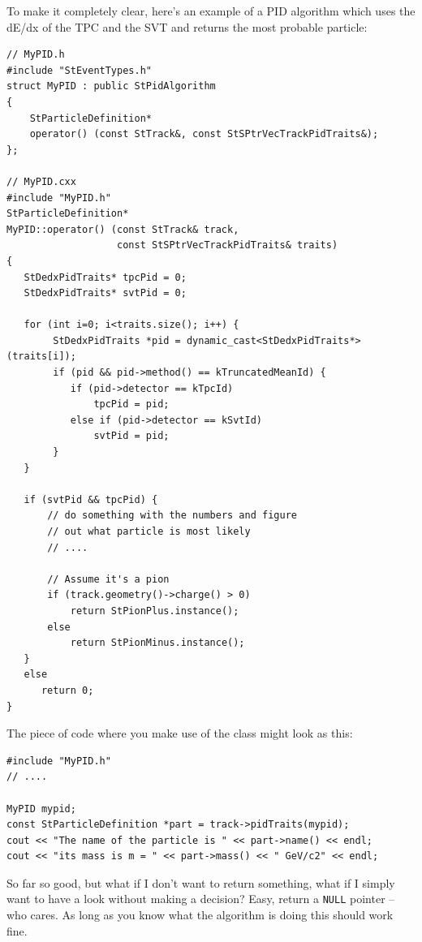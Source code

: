 \documentclass[twoside]{article}
\begin{document}
To make it completely clear, here's an example of a PID algorithm
which uses the dE/dx of the TPC and the SVT and returns the most
probable particle:
\begin{verbatim}
// MyPID.h
#include "StEventTypes.h"
struct MyPID : public StPidAlgorithm
{
    StParticleDefinition*
    operator() (const StTrack&, const StSPtrVecTrackPidTraits&);
};

// MyPID.cxx
#include "MyPID.h"
StParticleDefinition*
MyPID::operator() (const StTrack& track,
                   const StSPtrVecTrackPidTraits& traits)
{
   StDedxPidTraits* tpcPid = 0;
   StDedxPidTraits* svtPid = 0;

   for (int i=0; i<traits.size(); i++) {
        StDedxPidTraits *pid = dynamic_cast<StDedxPidTraits*>(traits[i]);
        if (pid && pid->method() == kTruncatedMeanId) {
           if (pid->detector == kTpcId)
               tpcPid = pid;
           else if (pid->detector == kSvtId)
               svtPid = pid;
        }
   }

   if (svtPid && tpcPid) {
       // do something with the numbers and figure
       // out what particle is most likely
       // ....

       // Assume it's a pion
       if (track.geometry()->charge() > 0)
           return StPionPlus.instance();
       else
           return StPionMinus.instance();
   }
   else
      return 0;
}
\end{verbatim}
The piece of code where you make use of the class might look as this:
\begin{verbatim}
#include "MyPID.h"
// ....

MyPID mypid;
const StParticleDefinition *part = track->pidTraits(mypid);
cout << "The name of the particle is " << part->name() << endl;
cout << "its mass is m = " << part->mass() << " GeV/c2" << endl;
\end{verbatim}

So far so good, but what if I don't want to return something, what if
I simply want to have a look without making a decision? Easy, return a
\texttt{NULL} pointer -- who cares.  As long as you know what the
algorithm is doing this should work fine.
\end{document}
